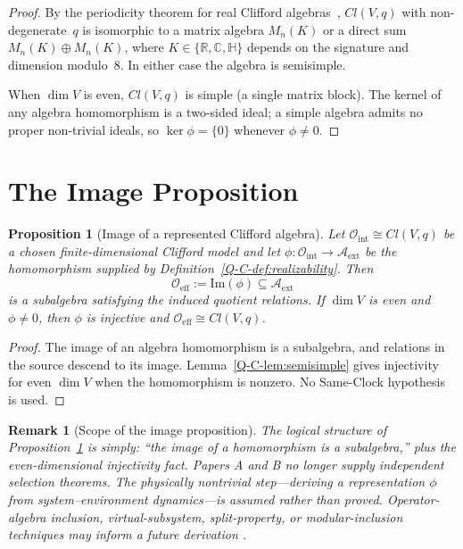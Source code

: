 \documentclass[12pt,a4paper,openany]{book}
\newtheorem{proposition}[theorem]{Proposition}
\newtheorem{remark}[theorem]{Remark}
\begin{document}
\begin{proof}
By the periodicity theorem for real Clifford
algebras~\cite{ABS1964,LawsonMichelsohn1989}, $Cl(V,q)$
with non-degenerate~$q$ is isomorphic to a matrix algebra
$M_n(K)$ or a direct sum $M_n(K) \oplus M_n(K)$,
where $K \in \{\mathbb{R}, \mathbb{C}, \mathbb{H}\}$
depends on the signature and dimension modulo~$8$.
In either case the algebra is semisimple.

When $\dim V$ is even, $Cl(V,q)$ is simple (a single matrix
block).
The kernel of any algebra homomorphism is a two-sided ideal;
a simple algebra admits no proper non-trivial ideals,
so $\ker\phi = \{0\}$ whenever $\phi \neq 0$.
\end{proof}

\section{The Image Proposition}
\label{Q-C-sec:closure}

\begin{proposition}[Image of a represented Clifford algebra]
\label{Q-C-prop:image}
Let $\mathcal{O}_{\mathrm{int}}\cong Cl(V,q)$ be a chosen finite-dimensional Clifford model and let $\phi:\mathcal O_{\mathrm{int}}\to\mathcal A_{\mathrm{ext}}$ be the homomorphism supplied by Definition~\ref{Q-C-def:realizability}.  Then
\begin{equation}
    \mathcal{O}_{\mathrm{eff}} := \mathrm{Im}(\phi) \subseteq \mathcal{A}_{\mathrm{ext}}
\end{equation}
is a subalgebra satisfying the induced quotient relations.  If $\dim V$ is even and $\phi\ne0$, then $\phi$ is injective and $\mathcal O_{\mathrm{eff}}\cong Cl(V,q)$.
\end{proposition}

\begin{proof}
The image of an algebra homomorphism is a subalgebra, and relations in the source descend to its image.  Lemma~\ref{Q-C-lem:semisimple} gives injectivity for even $\dim V$ when the homomorphism is nonzero.  No Same-Clock hypothesis is used.
\end{proof}

\begin{remark}[Scope of the image proposition]
\label{Q-C-rem:scope}
The logical structure of Proposition~\ref{Q-C-prop:image} is simply: ``the image of a homomorphism is a subalgebra,'' plus the even-dimensional injectivity fact.  Papers A and B no longer supply independent selection theorems.  The physically nontrivial step---deriving a representation $\phi$ from system--environment dynamics---is assumed rather than proved.  Operator-algebra inclusion, virtual-subsystem, split-property, or modular-inclusion techniques may inform a future derivation \cite{Zanardi2001,DoplicherLongo1984,Wiesbrock1993}.
\end{remark}
\end{document}
